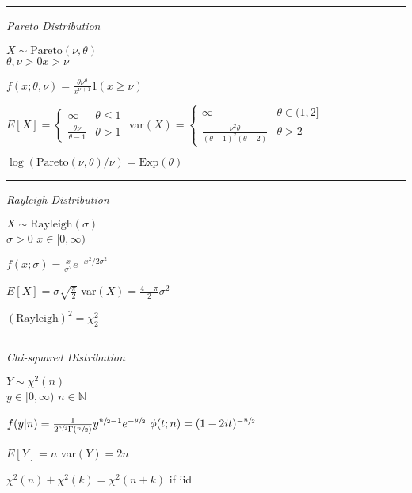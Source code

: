 \documentclass[notitlepage,10pt,twocolumn]{article}
\begin{document}
\vspace{.15cm}\hrule \vspace{.15cm}

\emph{\sffamily Pareto Distribution}

$X \sim \text{Pareto}(\nu,\theta)$\\
$\theta,\nu>0$\quad$x>\nu$

$f(x;\theta,\nu) = \frac{\theta \nu^\theta}{x^{\nu+1}}1(x\ge\nu)$

$E[X] = \begin{cases}
\infty & \theta \le 1\\
\frac{\theta \nu}{\theta-1}&\theta>1
\end{cases}$ \quad var$(X) = \begin{cases}
\infty & \theta \in (1,2]\\
\frac{\nu^2\theta}{(\theta-1)^2(\theta-2)} & \theta >2
\end{cases}$

$\log(\text{Pareto}(\nu,\theta)/\nu) = \text{Exp}(\theta)$

\vspace{.15cm}\hrule \vspace{.15cm}

\emph{\sffamily Rayleigh Distribution}

$X \sim \text{Rayleigh}(\sigma)$\\
$\sigma > 0$ \quad $x\in[0,\infty)$

$f(x;\sigma) = \frac{x}{\sigma^2}e^{-x^2 / 2\sigma^2}$

$E[X] = \sigma\sqrt{\frac{\pi}{2}}$ \quad var$(X) = \frac{4-\pi}{2}\sigma^2$

$(\text{Rayleigh})^2 = \chi^2_2$

\vspace{.15cm}\hrule \vspace{.15cm}

\emph{\sffamily Chi-squared Distribution}

$Y \sim \chi^2(n)$\\
	$y\in [0,\infty)$ \quad $n \in \mathbb{N}$

$f(y|n) = \frac{1}{2^{\sfrac{n}{2}}\Gamma(\sfrac{n}{2})}y^{\sfrac{n}{2}-1} e^{-\sfrac{y}{2}}$ \quad $\phi(t;n) = (1-2it)^{-\sfrac{n}{2}}$

$E[Y] = n$ \quad var$(Y) = 2n$

$\chi^2(n) +  \chi^2(k) =  \chi^2(n+k)$ if iid
\end{document}
